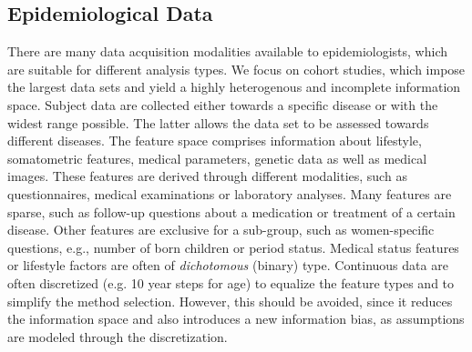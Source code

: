 \documentclass[journal]{style/vgtc} 			          %
\newcommand{\com}[1]{\textcolor{orange}{\uline{#1}}}
\begin{document}
\subsection{Epidemiological Data} \label{sec:EpidemiologicalData}
There are many data acquisition modalities available to epidemiologists, which are suitable for different analysis types.
We focus on cohort studies, which impose the largest data sets and yield a highly heterogenous and incomplete information space.
Subject data are collected either towards a specific disease or with the widest range possible.
The latter allows the data set to be assessed towards different diseases.
The feature space comprises information about lifestyle, somatometric features, medical parameters, genetic data as well as medical images.
These features are derived through different modalities, such as questionnaires, medical examinations or laboratory analyses.
Many features are sparse, such as follow-up questions about a medication or treatment of a certain disease.
Other features are exclusive for a sub-group, such as women-specific questions, e.g., number of born children or period status.
Medical status features or lifestyle factors are often of \emph{dichotomous} (binary) type.
Continuous data are often discretized (e.g. 10 year steps for age) to equalize the feature types and to simplify the method selection.
However, this should be avoided, since it reduces the information space and also introduces a new information bias, as assumptions are modeled through the discretization.
\end{document}
